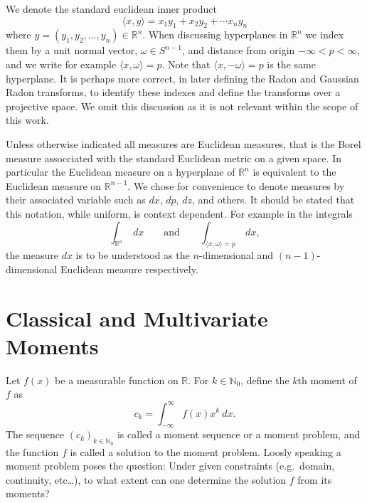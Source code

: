 \documentclass{amsart}
\theoremstyle{remark}
\numberwithin{equation}{section}
\newcommand{\RR}{\mathbb{R}}
\newcommand{\NN}{\mathbb{N}}
\begin{document}
We denote the standard euclidean inner product
\[
    \langle x,y \rangle = x_1y_1 + x_2y_2 + \cdots x_n y_n
\]
where $y = (y_1, y_2, \ldots, y_n) \in \RR^n$. When discussing hyperplanes in $\RR^n$ we index them by a unit normal vector, $\omega \in S^{n-1}$, and distance from origin $-\infty < p < \infty$, and we write for example $\langle x, \omega \rangle = p$. Note that $\langle x, -\omega \rangle = p$ is the same hyperplane. It is perhaps more correct, in later defining the Radon and Gaussian Radon transforms, to identify these indexes and define the transforms over a projective space. We omit this discussion as it is not relevant within the scope of this work.
\begin{figure}
\end{figure}

Unless otherwise indicated all measures are Euclidean measures, that is the Borel measure assocciated with the standard Euclidean metric on a given space. In particular the Euclidean measure on a hyperplane of $\RR^n$ is equivalent to the Euclidean measure on $\RR^{n-1}$. We chose for convenience to denote measures by their associated variable such as $dx$, $dp$, $dz$, and others. It should be stated that this notation, while uniform, is context dependent. For example in the integrals
\[
    \int_{\RR^n}~dx \qquad \text{and} \qquad \int_{\langle x, \omega\rangle = p} ~dx,
\]
the measure $dx$ is to be understood as the $n$-dimensional and $(n-1)$-dimensional Euclidean measure respectively.

\newpage
\section{Classical and Multivariate Moments}
Let $f(x)$ be a measurable function on $\RR$. For $k \in \NN_0$, define the $k$th moment of $f$ as
\[
    c_k = \int_{-\infty}^\infty f(x)x^k ~dx.
\]
The sequence ${(c_k)}_{k \in \NN_0}$ is called a moment sequence or a moment problem, and the function $f$ is called a solution to the moment problem. Loosly speaking a moment problem poses the question: Under given constraints (e.g.\ domain, continuity, etc\ldots), to what extent can one determine the solution $f$ from its moments?
\end{document}
